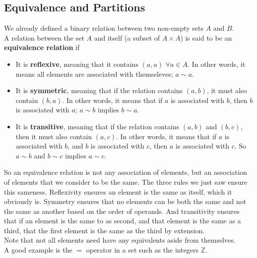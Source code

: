 \documentclass[12pt]{article}
\newcommand{\Z}{\mathbb{Z}}
\begin{document}
    \subsection*{Equivalence and Partitions}
    We already defined a binary relation between two non-empty sets
    $A$ and $B$. \\
    A relation between the set $A$ and itself 
    (a subset of $A \times A$)
    is said to be an \textbf{equivalence relation} if 
    \begin{itemize}[label=$\diamond$]
        \item 
            It is \textbf{reflexive},
            meaning that it contains $(a, a)$ $\forall a \in A$.
            In other words, it means all elements are
            associated with themseleves; $a \sim a$.
        \item 
            It is \textbf{symmetric},
            meaning that if the relation contains $(a, b)$,
            it must also contain $(b, a)$. 
            In other words, it means that if $a$ is associated
            with $b$, then $b$ is associated with $a$;
            $a \sim b$ implies $b \sim a$.
        \item
            It is \textbf{transitive},
            meaning that if the relation contains $(a, b)$
            and $(b, c)$,
            then it must also contain $(a, c)$.
            In other words, it means that if $a$ is associated
            with $b$, and $b$ is associated with $c$,
            then $a$ is associated with $c$.
            So $a \sim b$ and $b \sim c$ implies $a \sim c$.
    \end{itemize} 
    So an equivalence relation is not any association of elements,
    but an association of elements that we consider to be the same.
    The three rules we just saw ensure this sameness.
    Reflexivity ensures an element is the same as itself,
    which it obviously is.
    Symmetry ensures that no elements can be both the same
    and not the same as another based on the order of operands.
    And transitivity ensures that if an element is the same to as second,
    and that element is the same as a third,
    that the first element is the same as the third by extension. \\
    Note that not all elements need have any equivalents
    aside from themselves. \\
    A good example is the $=$ operator in a set
    such as the integers $\Z$. \\
    
\end{document}
